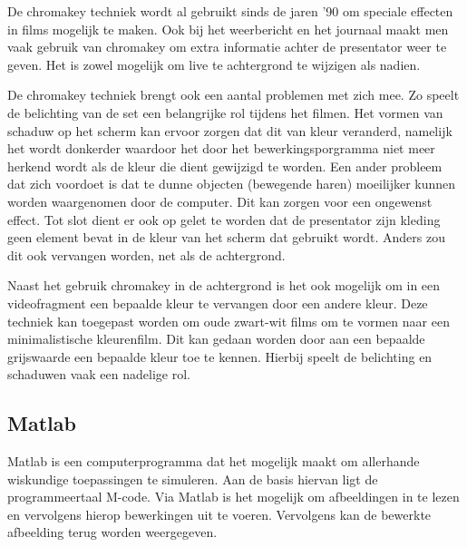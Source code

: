 \par De chromakey techniek wordt al gebruikt sinds de jaren '90 om speciale effecten in films mogelijk te maken. Ook bij het 
weerbericht en het journaal maakt men vaak gebruik van chromakey om extra informatie achter de presentator weer te geven. Het is zowel mogelijk
om live te achtergrond te wijzigen als nadien. \bigskip

\par De chromakey techniek brengt ook een aantal problemen met zich mee. Zo speelt de belichting van de set een belangrijke
rol tijdens het filmen. Het vormen van schaduw op het scherm kan ervoor zorgen dat dit van kleur veranderd, namelijk het wordt
donkerder waardoor het door het bewerkingsporgramma niet meer herkend wordt als de kleur die dient gewijzigd te worden. Een ander
probleem dat zich voordoet is dat te dunne objecten (bewegende haren) moeilijker kunnen worden waargenomen door de computer. Dit kan zorgen
voor een ongewenst effect. Tot slot dient er ook op gelet te worden dat de presentator zijn kleding geen element bevat in de kleur van het 
scherm dat gebruikt wordt. Anders zou dit ook vervangen worden, net als de achtergrond.\bigskip

\par Naast het gebruik chromakey in de achtergrond is het ook mogelijk om in een videofragment een bepaalde kleur te vervangen door een andere
kleur. Deze techniek kan toegepast worden om oude zwart-wit films om te vormen naar een minimalistische kleurenfilm. Dit kan gedaan worden door
aan een bepaalde grijswaarde een bepaalde kleur toe te kennen. Hierbij speelt de belichting en schaduwen vaak een nadelige rol.

\subsection {Matlab}

\par Matlab is een computerprogramma dat het mogelijk maakt om allerhande wiskundige toepassingen te simuleren. Aan de basis hiervan ligt de 
programmeertaal M-code. Via Matlab is het mogelijk om afbeeldingen in te lezen en vervolgens hierop bewerkingen uit te voeren. Vervolgens kan 
de bewerkte afbeelding terug worden weergegeven. 